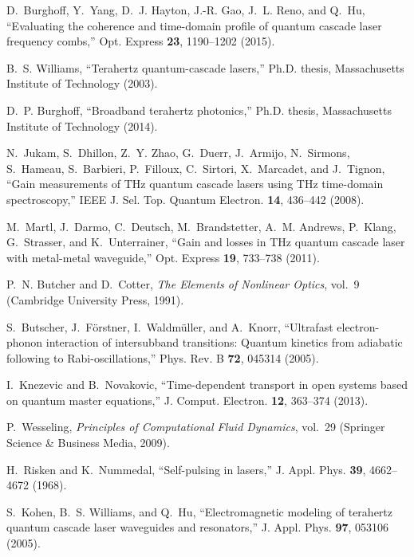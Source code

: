 \documentclass[10pt]{article}
\begin{document}
\begin{thebibliography}{10}
	D.~Burghoff, Y.~Yang, D.~J. Hayton, J.-R. Gao, J.~L. Reno, and Q.~Hu,
	\enquote{Evaluating the coherence and time-domain profile of quantum cascade
		laser frequency combs,} Opt. Express \textbf{23}, 1190--1202 (2015).
	
	B.~S. Williams, \enquote{Terahertz quantum-cascade lasers,} Ph.D. thesis,
	Massachusetts Institute of Technology (2003).
	
	D.~P. Burghoff, \enquote{Broadband terahertz photonics,} Ph.D. thesis,
	Massachusetts Institute of Technology (2014).
	
	N.~Jukam, S.~Dhillon, Z.~Y. Zhao, G.~Duerr, J.~Armijo, N.~Sirmons, S.~Hameau,
	S.~Barbieri, P.~Filloux, C.~Sirtori, X.~Marcadet, and J.~Tignon,
	\enquote{{Gain measurements of THz quantum cascade lasers using THz
			time-domain spectroscopy},} IEEE J. Sel. Top. Quantum Electron. \textbf{14},
	436--442 (2008).
	
	M.~Martl, J.~Darmo, C.~Deutsch, M.~Brandstetter, A.~M. Andrews, P.~Klang,
	G.~Strasser, and K.~Unterrainer, \enquote{Gain and losses in {THz} quantum
		cascade laser with metal-metal waveguide,} Opt. Express \textbf{19}, 733--738
	(2011).
	
	P.~N. Butcher and D.~Cotter, \emph{{The Elements of Nonlinear Optics}}, vol.~9
	(Cambridge University Press, 1991).
	
	S.~Butscher, J.~F{\"o}rstner, I.~Waldm{\"u}ller, and A.~Knorr,
	\enquote{Ultrafast electron-phonon interaction of intersubband transitions:
		Quantum kinetics from adiabatic following to {R}abi-oscillations,} Phys. Rev.
	B \textbf{72}, 045314 (2005).
	
	I.~Knezevic and B.~Novakovic, \enquote{Time-dependent transport in open systems
		based on quantum master equations,} J. Comput. Electron. \textbf{12},
	363--374 (2013).
	
	P.~Wesseling, \emph{{Principles of Computational Fluid Dynamics}}, vol.~29
	(Springer Science \& Business Media, 2009).
	
	H.~Risken and K.~Nummedal, \enquote{Self-pulsing in lasers,} J. Appl. Phys.
	\textbf{39}, 4662--4672 (1968).
	
	S.~Kohen, B.~S. Williams, and Q.~Hu, \enquote{Electromagnetic modeling of
		terahertz quantum cascade laser waveguides and resonators,} J. Appl. Phys.
	\textbf{97}, 053106 (2005).
\end{thebibliography}
\end{document}
